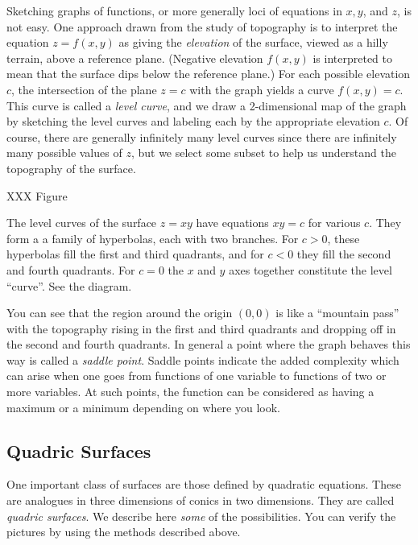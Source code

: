 Sketching graphs of functions, or more generally loci of equations
in $x, y$, and $z$, is not easy.   One approach drawn from the
study of topography is to interpret the equation $z = f(x,y)$ as
giving the \emph{elevation} of the surface, viewed as a hilly
terrain, above a reference plane.  (Negative elevation
 $f(x,y)$ is
interpreted to mean that the surface dips below the reference plane.)
For each possible elevation $c$,
 the intersection of the plane $z = c$ with the graph
yields a curve $f(x,y) = c$.  This curve is called a \emph{level curve}, 
and we draw a 2-dimensional map of the graph by sketching
the level curves and labeling each by the appropriate elevation
$c$.  Of course, there are generally infinitely many level curves
since there are infinitely many possible values of $z$, but we
select some subset to help us understand the topography of the
surface.

XXX Figure

\begin{example}
	The level curves of the surface $z = xy$ have equations
	$xy = c$ for various $c$.  They form a 
	a family of hyperbolas, each with two branches.  For $c > 0$,
	these hyperbolas fill the first and third quadrants, and for
	$c < 0$ they fill the second and fourth quadrants.  For $c  = 0$
	the $x$ and $y$ axes together constitute the level ``curve''.
	See the diagram.

	You can see that the region around the origin $(0,0)$ is like a
	``mountain pass'' with the topography rising in the first and
	third quadrants and dropping off in the second and fourth quadrants.
	In general a point where the graph behaves this way is called
	a \emph{saddle point}.   Saddle points indicate the added complexity
	which can arise when one goes from functions of one variable to
	functions of two or more variables.  At such points, the function
	can be considered as having a maximum  or
	 a minimum depending on where you
	look.
\end{example}

\subsection{Quadric Surfaces}
One important class of surfaces are those defined by quad\-rat\-ic
equations.  These are analogues in three dimensions of
conics in two dimensions.  They are called \emph{quadric surfaces}.  
We describe here \emph{some} of the possibilities.
You can verify the pictures by using the methods described above.

